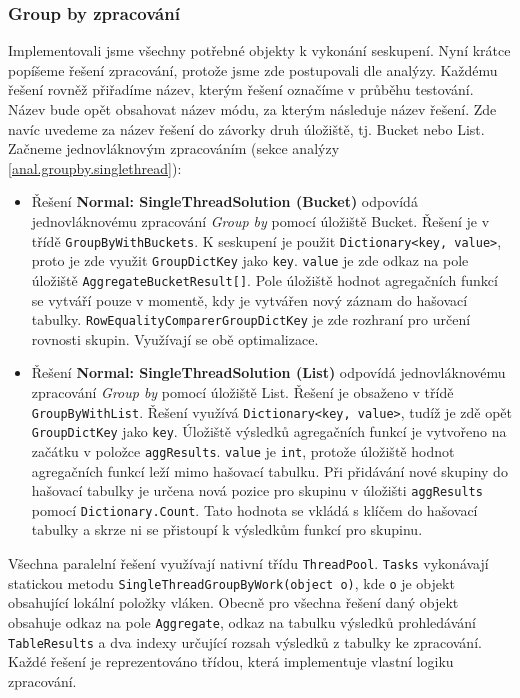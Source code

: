 \subsubsection{Group by zpracování}

Implementovali jsme všechny potřebné objekty k vykonání seskupení.
Nyní krátce popíšeme řešení zpracování, protože jsme zde postupovali dle analýzy.
Každému řešení rovněž přiřadíme název, kterým řešení označíme v průběhu testování.
Název bude opět obsahovat název módu, za kterým následuje název řešení.
Zde navíc uvedeme za název řešení do závorky druh úložiště, tj. Bucket nebo List.
Začneme jednovláknovým zpracováním (sekce analýzy \ref{anal.groupby.singlethread}):
\begin{itemize}

\item Řešení \textbf{Normal: SingleThreadSolution (Bucket)} odpovídá jednovláknovému zpracování \textit{Group by} pomocí úložiště Bucket.
Řešení je v třídě \texttt{GroupByWithBuckets}.
K seskupení je použit \texttt{Dictionary<key, value>}, proto je zde využit \texttt{GroupDictKey} jako \texttt{key}.
\texttt{value} je zde odkaz na pole úložiště \texttt{AggregateBucketResult[]}.
Pole úložiště hodnot agregačních funkcí se vytváří pouze v momentě, kdy je vytvářen nový záznam do hašovací tabulky.
\texttt{RowEqualityComparerGroupDictKey} je zde rozhraní pro určení rovnosti skupin.
Využívají se obě optimalizace.

\item  Řešení \textbf{Normal: SingleThreadSolution (List)} odpovídá jednovláknovému zpracování \textit{Group by} pomocí úložiště List.
Řešení je obsaženo v třídě \texttt{GroupByWithList}.
Řešení využívá \texttt{Dictionary<key, value>}, tudíž je zdě opět \texttt{GroupDictKey} jako \texttt{key}.
Úložiště výsledků agregačních funkcí je vytvořeno na začátku v položce \texttt{aggResults}.
\texttt{value} je \texttt{int}, protože úložiště hodnot agregačních funkcí leží mimo hašovací tabulku.
Při přidávání nové skupiny do hašovací tabulky je určena nová pozice pro skupinu v úložišti \texttt{aggResults} pomocí \texttt{Dictionary.Count}.
Tato hodnota se vkládá s klíčem do hašovací tabulky a skrze ni se přistoupí k výsledkům funkcí pro skupinu.
\end{itemize}
Všechna paralelní řešení využívají nativní třídu \texttt{ThreadPool}.
\texttt{Tasks} vykonávají statickou metodu \texttt{SingleThreadGroupByWork(object o)}, kde \texttt{o} je objekt obsahující lokální položky vláken.
Obecně pro všechna řešení daný objekt obsahuje odkaz na pole \texttt{Aggregate}, odkaz na tabulku výsledků prohledávání \texttt{TableResults} a dva indexy určující rozsah výsledků z tabulky ke zpracování.
Každé řešení je reprezentováno třídou, která implementuje vlastní logiku zpracování.

